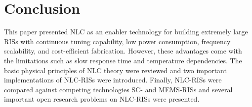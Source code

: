 \section{Conclusion}
\label{sc:conclusion}

This paper presented \gls{NLC} as an enabler technology for building extremely large \glspl{RIS} with continuous tuning capability, low power consumption, frequency scalability, and cost-efficient fabrication. However, these advantages come with the limitations such as slow response time and temperature dependencies. The basic physical principles of \gls{NLC} theory were reviewed and two important implementations of \gls{NLC}-\glspl{RIS} were introduced. Finally, \gls{NLC}-\glspl{RIS} were compared against competing technologies \gls{SC}- and \gls{MEMS}-\glspl{RIS} and several important open research problems on  \gls{NLC}-\glspl{RIS} were presented. 
